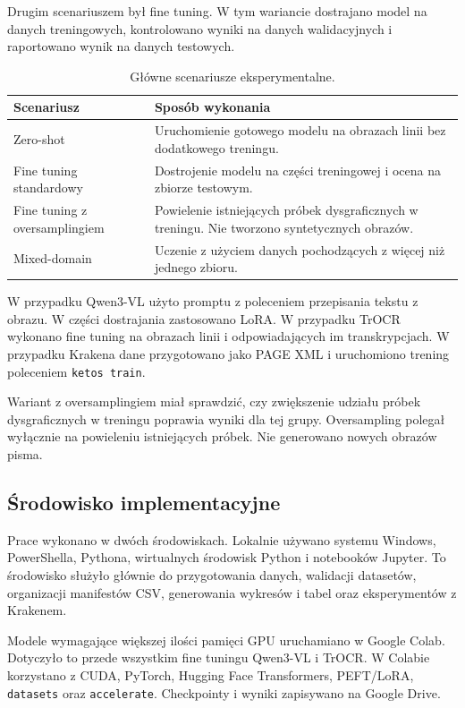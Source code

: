 Drugim scenariuszem był fine tuning. W tym wariancie dostrajano model na danych treningowych, kontrolowano wyniki na danych walidacyjnych i raportowano wynik na danych testowych.

\begin{table}[H]
    \centering
    \caption{Główne scenariusze eksperymentalne.}
    \label{tab:scenariusze-eksperymentalne}
    \begin{tabularx}{\textwidth}{lX}
        \hline
        Scenariusz & Sposób wykonania \\
        \hline
        Zero-shot & Uruchomienie gotowego modelu na obrazach linii bez dodatkowego treningu. \\
        Fine tuning standardowy & Dostrojenie modelu na części treningowej i ocena na zbiorze testowym. \\
        Fine tuning z oversamplingiem & Powielenie istniejących próbek dysgraficznych w treningu. Nie tworzono syntetycznych obrazów. \\
        Mixed-domain & Uczenie z użyciem danych pochodzących z więcej niż jednego zbioru. \\
        \hline
    \end{tabularx}
\end{table}

W przypadku Qwen3-VL użyto promptu z poleceniem przepisania tekstu z obrazu. W części dostrajania zastosowano LoRA. W przypadku TrOCR wykonano fine tuning na obrazach linii i odpowiadających im transkrypcjach. W przypadku Krakena dane przygotowano jako PAGE XML i uruchomiono trening poleceniem \texttt{ketos train}.

Wariant z oversamplingiem miał sprawdzić, czy zwiększenie udziału próbek dysgraficznych w treningu poprawia wyniki dla tej grupy. Oversampling polegał wyłącznie na powieleniu istniejących próbek. Nie generowano nowych obrazów pisma.

\subsection{Środowisko implementacyjne}
\label{subsec:srodowisko-implementacyjne}

Prace wykonano w dwóch środowiskach. Lokalnie używano systemu Windows, PowerShella, Pythona, wirtualnych środowisk Python i notebooków Jupyter. To środowisko służyło głównie do przygotowania danych, walidacji datasetów, organizacji manifestów CSV, generowania wykresów i tabel oraz eksperymentów z Krakenem.

Modele wymagające większej ilości pamięci GPU uruchamiano w Google Colab. Dotyczyło to przede wszystkim fine tuningu Qwen3-VL i TrOCR. W Colabie korzystano z CUDA, PyTorch, Hugging Face Transformers, PEFT/LoRA, \texttt{datasets} oraz \texttt{accelerate}. Checkpointy i wyniki zapisywano na Google Drive.

